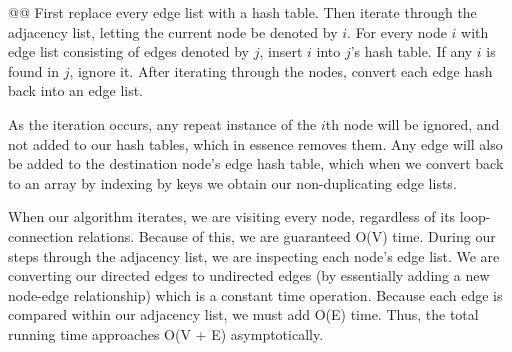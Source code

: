 \documentclass[10pt]{article}
\begin{document}
\begin{easylist}[enumerate]
    @@ First replace every edge list with a hash table. Then iterate through the adjacency list, letting the current
    node be denoted by $i$. For every node $i$ with edge list consisting of edges denoted by $j$, insert $i$ into $j$'s
    hash table. If any $i$ is found in $j$, ignore it. After iterating through the nodes, convert each edge hash back
    into an edge list. \newline

    As the iteration occurs, any repeat instance of the $i$th node will be ignored, and not added to our hash tables,
    which in essence removes them. Any edge will also be added to the destination node's edge hash table, which when we
    convert back to an array by indexing by keys we obtain our non-duplicating edge lists.\newline
    
    When our algorithm iterates, we are visiting every node, regardless of its loop-connection relations.  Because of
    this, we are guaranteed O(V) time. During our steps through the adjacency list, we are inspecting each node's edge
    list.  We are converting our directed edges to undirected edges (by essentially adding a new node-edge relationship)
    which is a constant time operation.  Because each edge is compared within our adjacency list, we must add O(E) time.
    Thus, the total running time approaches O(V + E) asymptotically.


\end{easylist}
\end{document}
